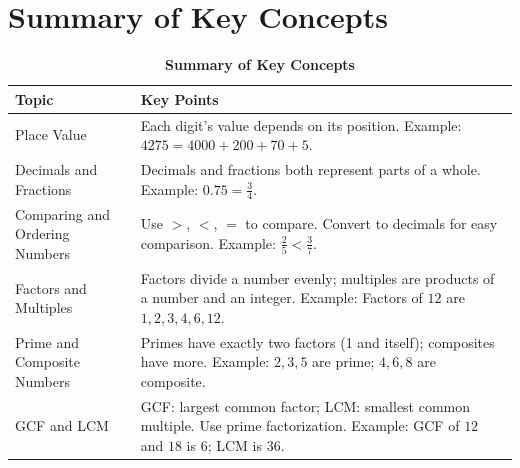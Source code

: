\section*{Summary of Key Concepts}
\begin{table}[h!]
\centering
\renewcommand{\arraystretch}{1.3}
\begin{tabularx}{\textwidth}{|l|X|}
\hline
\rowcolor[HTML]{E0E0E0}
\textbf{Topic} & \textbf{Key Points} \\
\hline
Place Value & Each digit's value depends on its position. Example: $4275 = 4000 + 200 + 70 + 5$. \\
\hline
Decimals and Fractions & Decimals and fractions both represent parts of a whole. Example: $0.75 = \frac{3}{4}$. \\
\hline
Comparing and Ordering Numbers & Use $>$, $<$, $=$ to compare. Convert to decimals for easy comparison. Example: $\frac{2}{5} < \frac{3}{7}$. \\
\hline
Factors and Multiples & Factors divide a number evenly; multiples are products of a number and an integer. Example: Factors of $12$ are $1,2,3,4,6,12$. \\
\hline
Prime and Composite Numbers & Primes have exactly two factors (1 and itself); composites have more. Example: $2,3,5$ are prime; $4,6,8$ are composite. \\
\hline
GCF and LCM & GCF: largest common factor; LCM: smallest common multiple. Use prime factorization. Example: GCF of $12$ and $18$ is $6$; LCM is $36$. \\
\hline
\end{tabularx}
\caption{\textbf{Summary of Key Concepts}}
\end{table}


